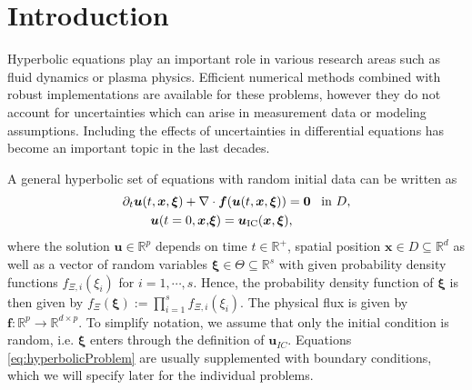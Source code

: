 \section{Introduction}
Hyperbolic equations play an important role in various research areas such as fluid dynamics or plasma physics. Efficient numerical methods combined with robust implementations are available for these problems, however they do not account for uncertainties which can arise in measurement data or modeling assumptions. Including the effects of uncertainties in differential equations has become an important topic in the last decades. %

A general hyperbolic set of equations with random initial data can be written as
\begin{subequations}\label{eq:hyperbolicProblem}
\begin{align}
\partial_t \bm{u}(t,\bm{x},\bm{\xi}) + \nabla&\cdot\bm{f}(\bm{u}(t,\bm{x},\bm{\xi})) = \bm{0} \enskip \text{ in } D, \\ \label{eq:ic}
\bm{u}(t=0,\bm{x},&\bm{\xi}) = \bm{u}_{\text{IC}}(\bm{x},\bm{\xi}),
\end{align}
\end{subequations}
where the solution $\bm u\in\mathbb{R}^p$ depends on time $t\in\mathbb{R}^+$, spatial position $\bm{x}\in D\subseteq \mathbb{R}^d$ as well as a vector of random variables $\bm{\xi}\in\Theta\subseteq\mathbb{R}^s$ with given probability density functions $f_{\Xi,i}(\xi_i)$ for $i = 1,\cdots,s$. Hence, the probability density function of $\bm{\xi}$ is then given by $f_{\Xi}(\bm\xi):=\prod_{i=1}^s f_{\Xi,i}(\xi_i)$. The physical flux is given by $\bm{f}:\mathbb{R}^p\to\mathbb{R}^{d\times p}$. To simplify notation, we assume that only the initial condition is random, i.e. $\bm{\xi}$ enters through the definition of $\bm{u}_{IC}$. Equations \eqref{eq:hyperbolicProblem} are usually supplemented with boundary conditions, which we will specify later for the individual problems.

